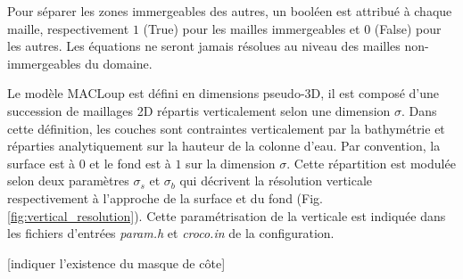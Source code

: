 \documentclass[10pt,a4paper,titlepage]{article}
\begin{document}
    
    Pour séparer les zones immergeables des autres, un booléen est attribué à chaque maille, respectivement $1$ (True) pour les mailles immergeables et $0$ (False) pour les autres.
    Les équations ne seront jamais résolues au niveau des mailles non-immergeables du domaine.
    
    Le modèle MACLoup est défini en dimensions pseudo-3D, il est composé d'une succession de maillages 2D répartis verticalement selon une dimension $\sigma$.
    Dans cette définition, les couches sont contraintes verticalement par la bathymétrie et réparties analytiquement sur la hauteur de la colonne d'eau.
    Par convention, la surface est à $0$ et le fond est à $1$ sur la dimension $\sigma$.
    Cette répartition est modulée selon deux paramètres $\sigma_{s}$ et $\sigma_{b}$ qui décrivent la résolution verticale respectivement à l'approche de la surface et du fond (Fig. \ref{fig:vertical_resolution}).
    Cette paramétrisation de la verticale est indiquée dans les fichiers d'entrées \textit{param.h} et \textit{croco.in} de la configuration.
    
    [indiquer l'existence du masque de côte]
    
\end{document}
